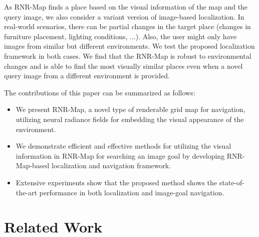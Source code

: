 \documentclass[10pt,twocolumn,letterpaper]{article}
\def\proposed{RNR-Map\xspace}
\begin{document}
As \proposed finds a place based on the visual information of the map and the query image, we also consider a variant version of image-based localization.
%
In real-world scenarios, there can be partial changes in the target place (changes in furniture placement, lighting conditions, ...). 
Also, the user might only have images from similar but different environments.
%
We test the proposed localization framework in both cases.
%
We find that the \proposed is robust to environmental changes and is able to find the most visually similar places even when a novel query image from a different environment is provided.

The contributions of this paper can be summarized as follows:
\begin{itemize}
    \item We present \proposed, a novel type of renderable grid map for navigation, utilizing neural radiance fields for embedding the visual appearance of the environment.
    \item We demonstrate efficient and effective methods for utilizing the visual information in \proposed for searching an image goal by developing \proposed-based localization and navigation framework. 
    \item Extensive experiments show that the proposed method shows the state-of-the-art performance in both localization and image-goal navigation.
\end{itemize}


\section{Related Work}
\end{document}
